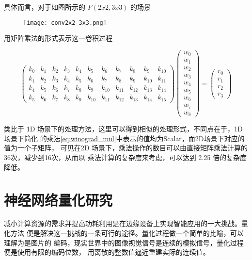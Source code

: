 具体而言，对于如图所示的 $F(2x2, 3x3)$ 的场景
\begin{figure}
\label{fig:conv2x2_3x3}
  \texttt{[image: conv2x2\_3x3.png]}
\end{figure}

用矩阵乘法的形式表示这一卷积过程

\[
\label{eq:f2x3}
  \begin{pmatrix}
    k_0 & k_1 & k_2 & k_3 & k_4 & k_5 & k_6 & k_7 & k_8 & k_9 & k_10 \\
    k_1 & k_2 & k_3 & k_4 & k_5 & k_6 & k_7 & k_8 & k_9 & k_10 & k_11 \\
    k_4 & k_5 & k_6 & k_7 & k_8 & k_9 & k_10 & k_11  & k_12 & k_13 & k_14 \\
    k_5 & k_6 & k_7 & k_8 & k_9 & k_10 & k_11 & k_12 & k_13 & k_14 & k_15
  \end{pmatrix}
  \begin{pmatrix}
    w_0 \\
    w_1 \\
    w_2 \\
    w_3 \\
    w_4 \\
    w_5 \\
    w_6 \\
    w_7 \\
    w_8
  \end{pmatrix}
  = 
  \begin{pmatrix}
    r_0 \\
    r_1 \\
    r_2 \\
    r_3
  \end{pmatrix}
\]

类比于 1D 场景下的处理方法，这里可以得到相似的处理形式，不同点在于，1D 场景下简化
的乘法\ref{eq:winograd_mul}中表示的值均为Scalar，而2D场景下对应的值为一个子矩阵，
可见在2D 场景下，乘法操作的数目可以由直接矩阵乘法计算的36次，减少到16次，从而以
乘法计算的复杂度来考虑，可以达到 2.25 倍的复杂度降低。

\section{神经网络量化研究}

减小计算资源的需求并提高功耗利用是在边缘设备上实现智能应用的一大挑战。量化方法
便是解决这一挑战的一条可行的途径。量化过程做一个简单的比喻，可以理解为是图片的
编码，现实世界中的图像视觉信号是连续的模拟信号，量化过程便是使用有限的编码位数，
用离散的整数值逼近重建实际的连续值。

